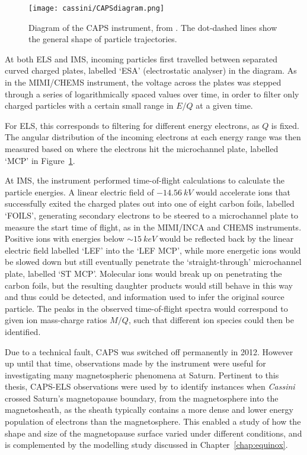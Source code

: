 \begin{figure}
\centering
\noindent\texttt{[image: cassini/CAPSdiagram.png]}
\caption[Diagram of the CAPS instrument.]{Diagram of the CAPS instrument, from \citet{young2004}. The dot-dashed lines show the general shape of particle trajectories.}
\label{cassini:fig:CAPSdiagram}
\end{figure}

At both ELS and IMS, incoming particles first travelled between separated curved charged plates, labelled `ESA' (electrostatic analyser) in  the diagram. As in the MIMI/CHEMS instrument, the voltage across the plates was stepped through a series of logarithmically spaced values over time, in order to filter only charged particles with a certain small range in $E/Q$ at a given time. 

For ELS, this corresponds to filtering for different energy electrons, as $Q$ is fixed. The angular distribution of the incoming electrons at each energy range was then measured based on where the electrons hit the microchannel plate, labelled `MCP' in Figure~\ref{cassini:fig:CAPSdiagram}. 

At IMS,  the instrument performed time-of-flight calculations to calculate the particle energies. A linear electric field of $\SI{-14.56}{kV}$ would accelerate ions that successfully exited the charged plates out into one of eight carbon foils,  labelled `FOILS', generating secondary electrons to be steered to a microchannel plate to measure the start time of flight, as in the MIMI/INCA and CHEMS instruments. Positive ions with energies below ${\sim}\SI{15}{keV}$ would be reflected back by the linear electric field labelled `LEF' into the `LEF MCP', while more energetic ions would be slowed down but still eventually penetrate the `straight-through' microchannel plate, labelled `ST MCP'. Molecular ions would break up on penetrating the carbon foils, but  the resulting daughter  products would still behave in this way and thus could be detected, and information used to infer the original source particle. The peaks in the observed time-of-flight spectra would correspond to given ion mass-charge ratios $M/Q$, such that different ion species could then be identified.

Due to a technical fault, CAPS was switched off permanently in 2012. However up until that time, observations made by the instrument were useful for investigating many magnetospheric phenomena at Saturn. Pertinent to  this  thesis, CAPS-ELS observations were used by \citet{pilkington2015} to identify instances when \textit{Cassini} crossed Saturn's magnetopause boundary, from the magnetosphere into the magnetosheath, as the sheath typically contains a more dense and lower energy population of electrons than the magnetosphere. This enabled a study of how the shape and size of the magnetopause surface varied under different conditions, and is complemented by the modelling study discussed in Chapter~\ref{chap:equinox}.

